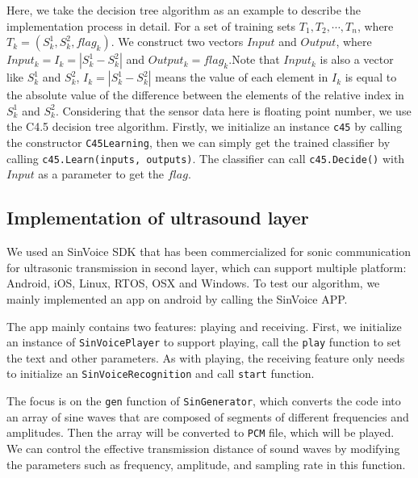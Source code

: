 Here, we take the decision tree algorithm as an example to describe the implementation process in detail. For a set of training sets $T_1, T_2,\cdots,T_n$, where $T_k=(S_k^1,S_k^2,flag_k)$. We construct two vectors $Input$ and $Output$, where $Input_k=I_k=|S_k^1-S_k^2|$ and $Output_k=flag_k$.Note that $Input_k$ is also a vector like $S_k^1$ and $S_k^2$, $I_k=|S_k^1-S_k^2|$ means the value of each element in $I_k$ is equal to the absolute value of the difference between the elements of the relative index in $S_k^1$ and $S_k^2$. Considering that the sensor data here is floating point number, we use the C4.5 decision tree algorithm. Firstly, we initialize an instance \texttt{c45} by calling the constructor \texttt{C45Learning}, then we can simply get the trained classifier by calling \texttt{c45.Learn(inputs, outputs)}. The classifier can call \texttt{c45.Decide()} with $Input$ as a parameter to get the $flag$.


\subsection{Implementation of ultrasound layer}
We used an SinVoice SDK\cite{sinvoice} that has been commercialized for sonic communication for ultrasonic transmission in second layer, which can support multiple platform: Android, iOS, Linux, RTOS, OSX and Windows. To test our algorithm, we mainly implemented an app on android by calling the SinVoice APP.




The app mainly contains two features: playing and receiving. First, we initialize an instance of \texttt{SinVoicePlayer} to support playing, call the \texttt{play} function to set the text and other parameters. As with playing, the receiving feature only needs to initialize an \texttt{SinVoiceRecognition} and call \texttt{start} function.



The focus is on the \texttt{gen} function of \texttt{SinGenerator}, which converts the code into an array of sine waves that are composed of segments of different frequencies and amplitudes. Then the array will be converted to \texttt{PCM} file, which will be played. We can control the effective transmission distance of sound waves by modifying the parameters such as frequency, amplitude, and sampling rate in this function.